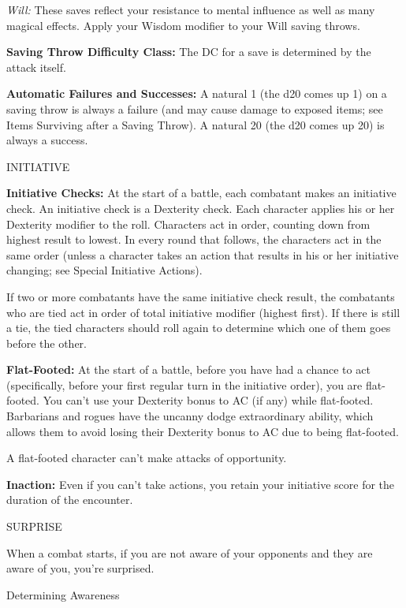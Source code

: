 \documentclass{article}
\begin{document}
\textit{Will: }These saves reflect your resistance to mental influence as well 
as many magical effects. Apply your Wisdom modifier to your Will saving throws.

\textbf{Saving Throw Difficulty Class:} The DC for a save is determined by the 
attack itself.

\textbf{Automatic Failures and Successes:} A natural 1 (the d20 comes up 1) on 
a saving throw is always a failure (and may cause damage to exposed items; see 
Items Surviving after a Saving Throw). A natural 20 (the d20 comes up 20) is always 
a success.

\vspace{12pt}
{\LARGE{}INITIATIVE}

\textbf{Initiative Checks:} At the start of a battle, each combatant makes an initiative 
check. An initiative check is a Dexterity check. Each character applies his or 
her Dexterity modifier to the roll. Characters act in order, counting down from 
highest result to lowest. In every round that follows, the characters act in the 
same order (unless a character takes an action that results in his or her initiative 
changing; see Special Initiative Actions).

If two or more combatants have the same initiative check result, the combatants 
who are tied act in order of total initiative modifier (highest first). If there 
is still a tie, the tied characters should roll again to determine which one of 
them goes before the other.

\textbf{Flat-Footed:} At the start of a battle, before you have had a chance to 
act (specifically, before your first regular turn in the initiative order), you 
are flat-footed. You can't use your Dexterity bonus to AC (if any) while flat-footed. 
Barbarians and rogues have the uncanny dodge extraordinary ability, which allows 
them to avoid losing their Dexterity bonus to AC due to being flat-footed.

A flat-footed character can't make attacks of opportunity.

\textbf{Inaction:} Even if you can't take actions, you retain your initiative score 
for the duration of the encounter.

\vspace{12pt}
SURPRISE

When a combat starts, if you are not aware of your opponents and they are aware 
of you, you're surprised.

\vspace{12pt}
Determining Awareness
\end{document}
